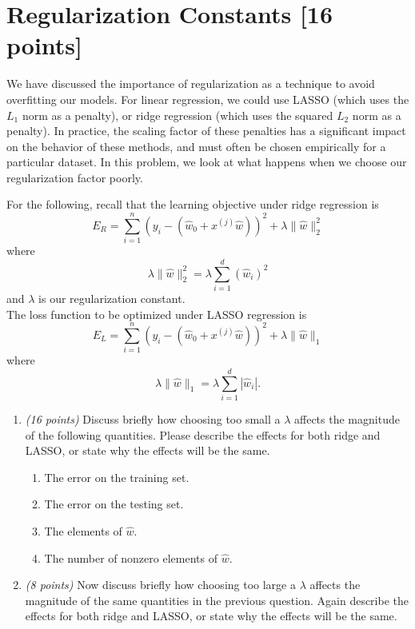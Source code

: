 \documentclass[letterpaper]{article}
\begin{document}
\section{Regularization Constants [16 points]}
We have discussed the importance of regularization as a technique to avoid
overfitting our models. For linear regression, we could use LASSO
(which uses the $L_1$ norm as a penalty), or ridge regression (which uses
the squared $L_2$ norm as a penalty). In practice, the scaling factor of these
penalties has a significant impact on the behavior of these methods, and must
often be chosen empirically for a particular dataset. In this problem, we look
at what happens when we choose our regularization factor poorly.

For the following, recall that the learning objective under ridge regression is
\[
E_R = \sum_{i=1}^n(y_i - (\hat w_0 + x^{(j)}\hat{w}))^2 + \lambda \| \hat w \|_2^2
\]
where
\begin{equation} \label{eq:ridgepenalty}
\lambda\|\hat w \|_2^2 = \lambda \sum_{i=1}^d (\hat w_i)^2
\end{equation}
and $\lambda$ is our regularization constant.\\

The loss function to be optimized under LASSO regression is
\[
E_L = \sum_{i=1}^n(y_i - (\hat w_0 + x^{(j)}\hat{w}))^2 + \lambda \| \hat w \|_1
\]
where
\begin{equation} \label{eq:lassopenalty}
\lambda \| \hat w \|_1 = \lambda \sum_{i=1}^d |\hat w_i|.
\end{equation}

\begin{enumerate}

\item \emph{(16 points)}
Discuss briefly how choosing too small a $\lambda$ affects the magnitude of
the following quantities.  Please describe the effects for both ridge and
LASSO, or state why the effects will be the same.
\begin{enumerate}
\item The error on the training set.
\item The error on the testing set.
\item The elements of $\hat{w}$.
\item The number of nonzero elements of $\hat{w}$.
\end{enumerate}

\item \emph{(8 points)}
Now discuss briefly how choosing too large a $\lambda$ affects the magnitude
of the same quantities in the previous question.  Again describe the effects
for both ridge and LASSO, or state why the effects will be the same.

\end{enumerate}
\end{document}
